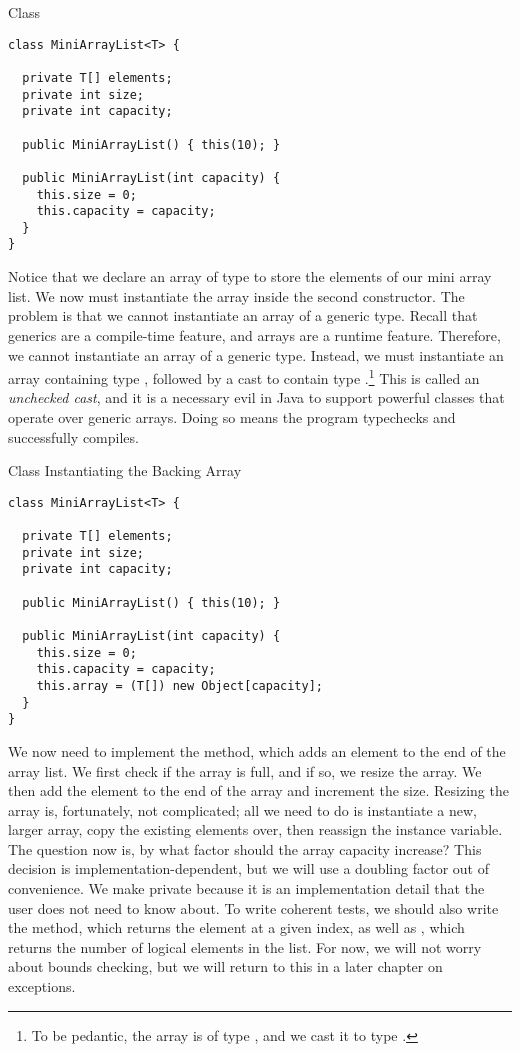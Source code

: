 \begin{cl}{ Class}
\begin{lstlisting}[language=MyJava]
class MiniArrayList<T> {

  private T[] elements;
  private int size;
  private int capacity;

  public MiniArrayList() { this(10); }

  public MiniArrayList(int capacity) {
    this.size = 0;
    this.capacity = capacity;
  }
}
\end{lstlisting}
\end{cl}

Notice that we declare an array of type  to store the elements of our mini array list. We now must instantiate the array inside the second constructor. The problem is that we cannot instantiate an array of a generic type. Recall that generics are a compile-time feature, and arrays are a runtime feature. Therefore, we cannot instantiate an array of a generic type. Instead, we must instantiate an array containing type , followed by a cast to contain type .\footnote{To be pedantic, the array is of type , and we cast it to type .} This is called an \textit{unchecked cast}, and it is a necessary evil in Java to support powerful classes that operate over generic arrays. Doing so means the program typechecks and successfully compiles.

\begin{cl}{ Class Instantiating the Backing Array}
\begin{lstlisting}[language=MyJava]
class MiniArrayList<T> {

  private T[] elements;
  private int size;
  private int capacity;

  public MiniArrayList() { this(10); }

  public MiniArrayList(int capacity) {
    this.size = 0;
    this.capacity = capacity;
    this.array = (T[]) new Object[capacity];
  }
}
\end{lstlisting}
\end{cl}

We now need to implement the  method, which adds an element to the end of the array list. We first check if the array is full, and if so, we resize the array. We then add the element to the end of the array and increment the size. Resizing the array is, fortunately, not complicated; all we need to do is instantiate a new, larger array, copy the existing elements over, then reassign the instance variable. The question now is, by what factor should the array capacity increase? This decision is implementation-dependent, but we will use a doubling factor out of convenience. We make  private because it is an implementation detail that the user does not need to know about. To write coherent tests, we should also write the  method, which returns the element at a given index, as well as , which returns the number of logical elements in the list. For now, we will not worry about bounds checking, but we will return to this in a later chapter on exceptions.

